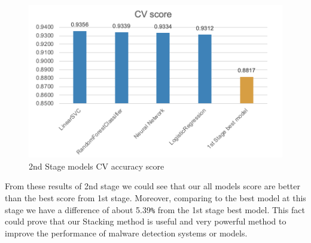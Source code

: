     \begin{figure}[htbp]
        \centering
        \includegraphics[scale=0.8]{./Figure/2ndstage.png}
        \caption{2nd Stage models CV accuracy score}
        \label{fig:2ndstage}
      \end{figure}

From these results of 2nd stage we could see that our all models score are better than the best score from 1st stage. Moreover, comparing to the best model at this stage we have a difference of about 5.39\verb+%+ from the 1st stage best model. This fact could prove that our Stacking method is useful and very powerful method to improve the performance of malware detection systems or models.